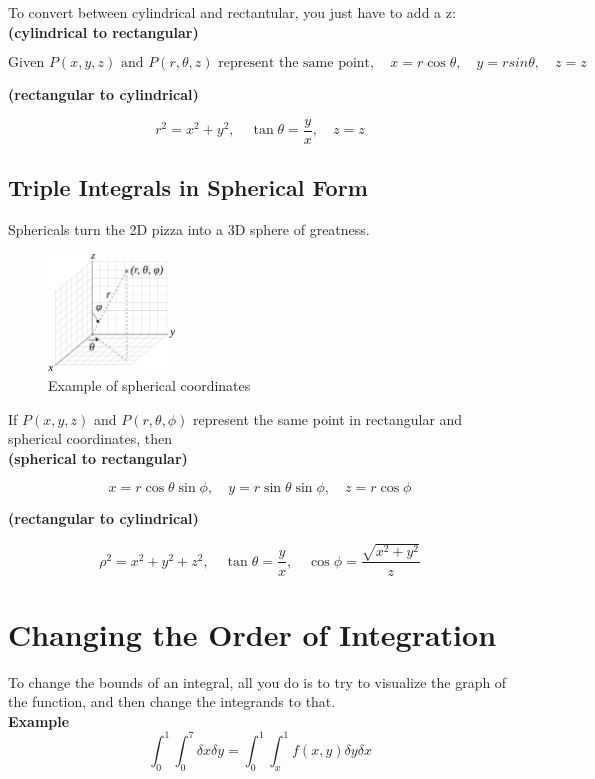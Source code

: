 \documentclass{article}
\begin{document}
To convert between cylindrical and rectantular, you just have to add a z:\\
\textbf{(cylindrical to rectangular)}

$$\text{Given } P(x, y, z) \text{ and } P(r,\theta, z) \text{ represent the same point},\quad x = r \cos\theta,\quad y = r sin \theta, \quad z = z$$

\textbf{(rectangular to cylindrical)}

$$r^2=x^2+y^2,\quad \tan \theta = \frac{y}{x}, \quad z = z$$

\subsection{Triple Integrals in Spherical Form}

Sphericals turn the 2D pizza into a 3D sphere of greatness.

\begin{figure}[H]
    \centering
    \includegraphics[width=0.3\textwidth]{figures/spherical_coordinates.png}
    \caption{Example of spherical coordinates}
\end{figure}

If $P(x, y, z)$ and $P(r, \theta, \phi)$ represent the same point in rectangular and spherical coordinates, then \\
\textbf{(spherical to rectangular)}

$$x = r\cos\theta\sin\phi, \quad y = r\sin\theta\sin\phi, \quad z = r\cos\phi$$

\textbf{(rectangular to cylindrical)}

$$\rho^2 = x^2 + y^2 + z^2, \quad \tan \theta = \frac{y}{x}, \quad \cos \phi = \frac{\sqrt{x^2 + y^2}}{z}$$

\section{Changing the Order of Integration}

To change the bounds of an integral, all you do is to try to visualize the graph of the function, and then change the integrands to that.\\
\textbf{Example}
$$\int_{0}^{1}\int_{0}^{7} \delta x \delta y = \int_{0}^{1} \int_{x}^{1} f(x, y) \delta y \delta x$$
\end{document}
